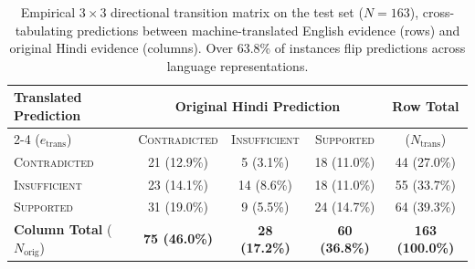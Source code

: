\begin{table}[t]
\centering
\small
\caption{Empirical $3 \times 3$ directional transition matrix on the test set ($N=163$), cross-tabulating predictions between machine-translated English evidence (rows) and original Hindi evidence (columns). Over 63.8\% of instances flip predictions across language representations.}
\label{tab:transition_matrix}
\begin{tabular}{lcccc}
\toprule
\textbf{Translated Prediction} & \multicolumn{3}{c}{\textbf{Original Hindi Prediction}} & \textbf{Row Total} \\
\cmidrule(lr){2-4}
($e_{\text{trans}}$) & \textsc{Contradicted} & \textsc{Insufficient} & \textsc{Supported} & ($N_{\text{trans}}$) \\
\midrule
\textsc{Contradicted} & 21 (12.9\%) & 5 (3.1\%) & 18 (11.0\%) & 44 (27.0\%) \\
\textsc{Insufficient} & 23 (14.1\%) & 14 (8.6\%) & 18 (11.0\%) & 55 (33.7\%) \\
\textsc{Supported}    & 31 (19.0\%) & 9 (5.5\%) & 24 (14.7\%) & 64 (39.3\%) \\
\midrule
\textbf{Column Total} ($N_{\text{orig}}$) & \textbf{75 (46.0\%)} & \textbf{28 (17.2\%)} & \textbf{60 (36.8\%)} & \textbf{163 (100.0\%)} \\
\bottomrule
\end{tabular}
\end{table}

